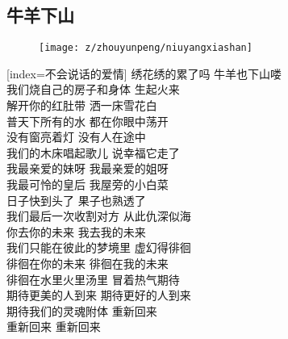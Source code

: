 \subsection{牛羊下山}

\begin{figure}[htp]
	\begin{center}
	  \texttt{[image: z/zhouyunpeng/niuyangxiashan]}
	  \label{fig:niuyangxiashan}
	\end{center}
\end{figure}

\begin{songs}{}
  [index={不会说话的爱情}]
	绣花绣的累了吗 \hspace{5mm} 牛羊也下山喽	\\
	我们烧自己的房子和身体 \hspace{5mm} 生起火来	\\
	解开你的红肚带 \hspace{5mm} 洒一床雪花白	\\
	普天下所有的水 \hspace{5mm} 都在你眼中荡开	\\
	没有窗亮着灯 \hspace{5mm} 没有人在途中	\\
	我们的木床唱起歌儿 \hspace{5mm} 说幸福它走了	\\
	我最亲爱的妹呀 \hspace{5mm} 我最亲爱的姐呀	\\
	我最可怜的皇后 \hspace{5mm} 我屋旁的小白菜	\\
	
	日子快到头了 \hspace{5mm} 果子也熟透了	\\
	我们最后一次收割对方 \hspace{5mm} 从此仇深似海	\\
	你去你的未来 \hspace{5mm} 我去我的未来	\\ 	
	我们只能在彼此的梦境里 \hspace{5mm} 虚幻得徘徊	\\
	徘徊在你的未来 \hspace{5mm} 徘徊在我的未来	\\
	徘徊在水里火里汤里 \hspace{5mm} 冒着热气期待	\\
	期待更美的人到来 \hspace{5mm} 期待更好的人到来	\\
	期待我们的灵魂附体 \hspace{5mm} 重新回来	\\
	重新回来 \hspace{5mm} 重新回来	\\
  \endsong
\end{songs}


